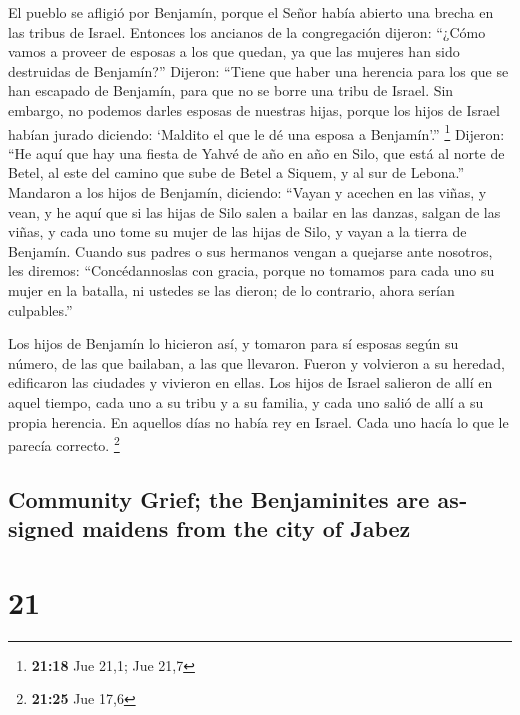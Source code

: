 \begin{paracol}{2}
 El pueblo se afligió por Benjamín, porque el Señor había
abierto una brecha en las tribus de Israel.  Entonces los
ancianos de la congregación dijeron: ``¿Cómo vamos a proveer de esposas
a los que quedan, ya que las mujeres han sido destruidas de Benjamín?''
 Dijeron: ``Tiene que haber una herencia para los que se
han escapado de Benjamín, para que no se borre una tribu de Israel.
 Sin embargo, no podemos darles esposas de nuestras
hijas, porque los hijos de Israel habían jurado diciendo: `Maldito el
que le dé una esposa a Benjamín'.'' \footnote{\textbf{21:18} Jue 21,1;
  Jue 21,7}  Dijeron: ``He aquí que hay una fiesta de
Yahvé de año en año en Silo, que está al norte de Betel, al este del
camino que sube de Betel a Siquem, y al sur de Lebona.'' 
Mandaron a los hijos de Benjamín, diciendo: ``Vayan y acechen en las
viñas,  y vean, y he aquí que si las hijas de Silo salen
a bailar en las danzas, salgan de las viñas, y cada uno tome su mujer de
las hijas de Silo, y vayan a la tierra de Benjamín. 
Cuando sus padres o sus hermanos vengan a quejarse ante nosotros, les
diremos: ``Concédannoslas con gracia, porque no tomamos para cada uno su
mujer en la batalla, ni ustedes se las dieron; de lo contrario, ahora
serían culpables.''

 Los hijos de Benjamín lo hicieron así, y tomaron para sí
esposas según su número, de las que bailaban, a las que llevaron. Fueron
y volvieron a su heredad, edificaron las ciudades y vivieron en ellas.
 Los hijos de Israel salieron de allí en aquel tiempo,
cada uno a su tribu y a su familia, y cada uno salió de allí a su propia
herencia.  En aquellos días no había rey en Israel. Cada
uno hacía lo que le parecía correcto. \footnote{\textbf{21:25} Jue 17,6}
\switchcolumn \begin{otherlanguage}{english}

\hypertarget{community-grief-the-benjaminites-are-assigned-maidens-from-the-city-of-jabez}{%
\subsection{Community Grief; the Benjaminites are assigned maidens from
the city of
Jabez}\label{community-grief-the-benjaminites-are-assigned-maidens-from-the-city-of-jabez}}

\hypertarget{section-41}{%
\section{21}\label{section-41}}


\end{otherlanguage}
\end{paracol}
